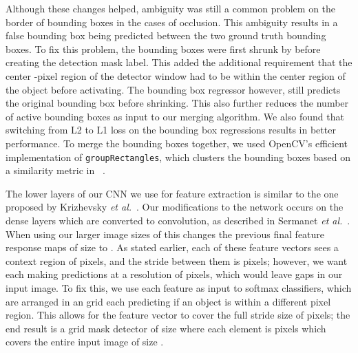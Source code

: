 \documentclass[journal]{IEEEtran}
\begin{document}
Although these changes helped, ambiguity was still a common problem on the border of bounding boxes in the cases of occlusion. This ambiguity results in a false bounding box being predicted between the two ground truth bounding boxes. To fix this problem, the bounding boxes were first shrunk by  before creating the detection mask label. This added the additional requirement that the center -pixel region of the detector window had to be within the center region of the object before activating. The bounding box regressor however, still predicts the original bounding box before shrinking. This also further reduces the number of active bounding boxes as input to our merging algorithm. We also found that switching from L2 to L1 loss on the bounding box regressions results in better performance. To merge the bounding boxes together, we used OpenCV's efficient implementation of \texttt{groupRectangles}, which clusters the bounding boxes based on a similarity metric in ~\cite{opencv}. 

The lower layers of our CNN we use for feature extraction is similar to the one proposed by Krizhevsky \textit{et al.}~\cite{krizhevsky-2012}. Our modifications to the network occurs on the dense layers which are converted to convolution, as described in Sermanet \textit{et al.}~\cite{sermanet-2013}. When using our larger image sizes of  this changes the previous final feature response maps of size  to . As stated earlier, each of these feature vectors sees a context region of  pixels, and the stride between them is  pixels; however, we want each making predictions at a resolution of  pixels, which would leave gaps in our input image. To fix this, we use each  feature as input to  softmax classifiers, which are arranged in an  grid each predicting if an object is within a different  pixel region. This allows for the  feature vector to cover the full stride size of  pixels; the end result is a grid mask detector of size  where each element is  pixels which covers the entire input image of size . 
\end{document}
